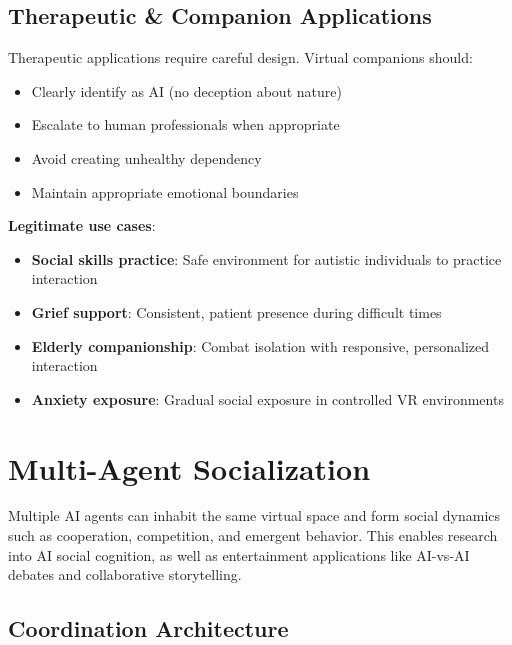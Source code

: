 \documentclass[11pt,letterpaper]{article}
\begin{document}
\subsection{Therapeutic \& Companion Applications}

\begin{warnbox}
Therapeutic applications require careful design. Virtual companions should:
\begin{itemize}[nosep]
  \item Clearly identify as AI (no deception about nature)
  \item Escalate to human professionals when appropriate
  \item Avoid creating unhealthy dependency
  \item Maintain appropriate emotional boundaries
\end{itemize}
\end{warnbox}

\textbf{Legitimate use cases}:
\begin{itemize}
  \item \textbf{Social skills practice}: Safe environment for autistic individuals to practice interaction
  \item \textbf{Grief support}: Consistent, patient presence during difficult times
  \item \textbf{Elderly companionship}: Combat isolation with responsive, personalized interaction
  \item \textbf{Anxiety exposure}: Gradual social exposure in controlled VR environments
\end{itemize}

\section{Multi-Agent Socialization}

\begin{tldrbox}
Multiple AI agents can inhabit the same virtual space and form social dynamics such as cooperation, competition, and emergent behavior. This enables research into AI social cognition, as well as entertainment applications like AI-vs-AI debates and collaborative storytelling.
\end{tldrbox}

\subsection{Coordination Architecture}
\end{document}
